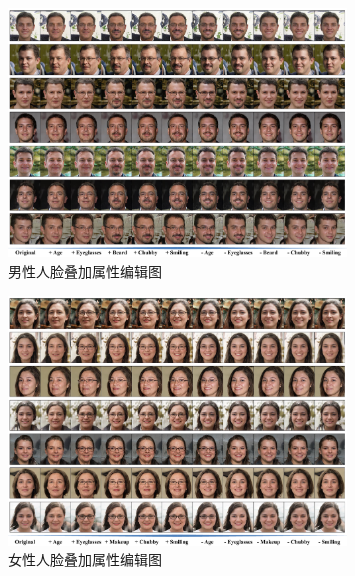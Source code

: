 \begin{figure}[!t]
     \begin{center}
          \includegraphics[width=0.8\textwidth]{figures/ACGAN//male.pdf}
     \end{center}
     \caption{男性人脸叠加属性编辑图}
     \label{fig:male}
\end{figure}

\begin{figure}[!t]
     \begin{center}
          \includegraphics[width=0.8\textwidth]{figures/ACGAN//female.pdf}
     \end{center}
     \caption{女性人脸叠加属性编辑图}
     \label{fig:female}
\end{figure}



